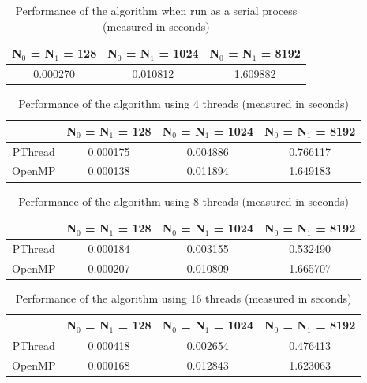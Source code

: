 \documentclass[10pt,twocolumn]{witseiepaper}
\begin{document}
\begin{table}[h]
	\centering
	\caption{Performance of the algorithm when run as a serial process (measured in seconds)}
	\begin{tabular}{|c|c|c|}
	\hline
	  N$_{0}$ = N$_{1}$ = 128 &  N$_{0}$ = N$_{1}$ = 1024 & N$_{0}$ = N$_{1}$ = 8192 \\
		\hline 
		0.000270  & 0.010812 & 1.609882 \\ 
		\hline 
	\end{tabular} 
\end{table} 

\begin{table}[h]
\centering
\caption{Performance of the algorithm using 4 threads (measured in seconds)}
\begin{tabular}{|c|c|c|c|}
	\hline 
	 & N$_{0}$ = N$_{1}$ = 128 &  N$_{0}$ = N$_{1}$ = 1024 & N$_{0}$ = N$_{1}$ = 8192 \\ 
	\hline 
	PThread & 0.000175 & 0.004886 & 0.766117 \\ 
	\hline 
	OpenMP & 0.000138 & 0.011894 & 1.649183 \\ 
	\hline 
\end{tabular}
\end{table} 

\begin{table}[h]
		\centering
\caption{Performance of the algorithm using 8 threads (measured in seconds)}
\begin{tabular}{|c|c|c|c|}
	\hline 
	 & N$_{0}$ = N$_{1}$ = 128 &  N$_{0}$ = N$_{1}$ = 1024 & N$_{0}$ = N$_{1}$ = 8192 \\ 
	\hline 
	PThread & 0.000184 & 0.003155 & 0.532490 \\ 
	\hline 
	OpenMP & 0.000207 & 0.010809 & 1.665707 \\ 
	\hline 
\end{tabular} 
\end{table}

\begin{table}[h]
		\centering
	\caption{Performance of the algorithm using 16 threads (measured in seconds)}
\begin{tabular}{|c|c|c|c|}
	\hline 
	 & N$_{0}$ = N$_{1}$ = 128 &  N$_{0}$ = N$_{1}$ = 1024 & N$_{0}$ = N$_{1}$ = 8192 \\ 
	\hline 
	PThread & 0.000418 & 0.002654 & 0.476413 \\ 
	\hline 
	OpenMP & 0.000168 & 0.012843 & 1.623063 \\ 
	\hline 
\end{tabular} 
\end{table}
\end{document}
